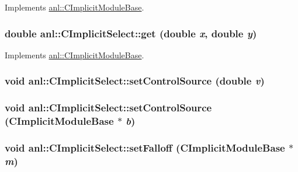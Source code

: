 Implements \hyperlink{classanl_1_1CImplicitModuleBase_ac17d592612c82ba3d47f9229a00b1fe3}{anl::CImplicitModuleBase}.\hypertarget{classanl_1_1CImplicitSelect_a0bc7db92ebc00afd8d195c31c207b234}{
\subsubsection[{get}]{\setlength{\rightskip}{0pt plus 5cm}double anl::CImplicitSelect::get (double {\em x}, \/  double {\em y})}}
\label{classanl_1_1CImplicitSelect_a0bc7db92ebc00afd8d195c31c207b234}


Implements \hyperlink{classanl_1_1CImplicitModuleBase_ab88f8a1822dcfbc13ba5230318b0acd1}{anl::CImplicitModuleBase}.\hypertarget{classanl_1_1CImplicitSelect_abd63ca67ec274d342ce65139a9f8b1f2}{
\subsubsection[{setControlSource}]{\setlength{\rightskip}{0pt plus 5cm}void anl::CImplicitSelect::setControlSource (double {\em v})}}
\label{classanl_1_1CImplicitSelect_abd63ca67ec274d342ce65139a9f8b1f2}
\hypertarget{classanl_1_1CImplicitSelect_af51e0883116835292269ee79bc10cdbb}{
\subsubsection[{setControlSource}]{\setlength{\rightskip}{0pt plus 5cm}void anl::CImplicitSelect::setControlSource ({\bf CImplicitModuleBase} $\ast$ {\em b})}}
\label{classanl_1_1CImplicitSelect_af51e0883116835292269ee79bc10cdbb}
\hypertarget{classanl_1_1CImplicitSelect_a0fcfd3dc21c5885e11078d908e4b2e65}{
\subsubsection[{setFalloff}]{\setlength{\rightskip}{0pt plus 5cm}void anl::CImplicitSelect::setFalloff ({\bf CImplicitModuleBase} $\ast$ {\em m})}}
